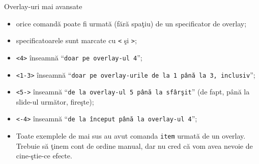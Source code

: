 \documentclass{beamer}
\begin{document}
\begin{frame}{Overlay-uri mai avansate}
\begin{itemize}
\item<3-> orice comandă poate fi urmată (fără spaţiu) de un specificator de
overlay;
\item<4-> specificatoarele sunt marcate cu \texttt{<} şi \texttt{>};
\item<5-> \texttt{<4>} înseamnă ``\texttt{doar pe overlay-ul 4}'';
\item<5-> \texttt{<1-3>} înseamnă ``\texttt{doar pe overlay-urile de la 1 până la 3,
inclusiv}'';
\item<6-> \texttt{<5->} înseamnă ``\texttt{de la overlay-ul 5 până la sfârşit}'' (de
fapt, până la slide-ul următor, fireşte);
\item<6-> \texttt{<-4>} înseamnă ``\texttt{de la început până la overlay-ul 4}'';
\item<7-> Toate exemplele de mai sus au avut comanda \texttt{item} urmată de
un overlay. Trebuie să ţinem cont de ordine manual, dar nu cred că vom avea
nevoie de cine-ştie-ce efecte.
\end{itemize}
\end{frame}
\end{document}
